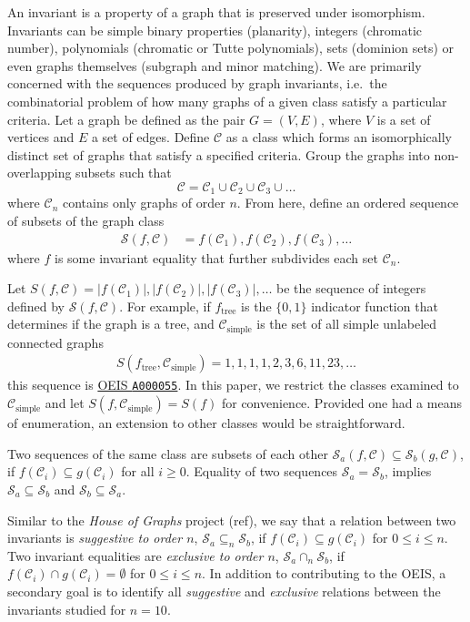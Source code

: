 \documentclass[12pt]{article}
\newcommand{\OEIS}[1]
{\href{https://oeis.org/#1}{OEIS \texttt{#1}}}
\newcommand{\SEQ}{\mathcal{S}}
\newcommand{\CLASS}{\mathcal{C}}
\newcommand{\SIMPLECLASS}{\mathcal{C}_\text{simple}}
\newcommand{\ie}[0]{i.e.\ }
\begin{document}
An invariant is a property of a graph that is preserved under isomorphism. 
Invariants can be simple binary properties (planarity), integers (chromatic number), polynomials (chromatic or Tutte polynomials), sets (dominion sets) or even graphs themselves (subgraph and minor matching).
We are primarily concerned with the sequences produced by graph invariants, \ie the combinatorial problem of how many graphs of a given class satisfy a particular criteria.
Let a graph be defined as the pair $G = (V,E)$, where $V$ is a set of vertices and $E$ a set of edges. 
Define $\CLASS$ as a class which forms an isomorphically distinct set of graphs that satisfy a specified criteria.
Group the graphs into non-overlapping subsets such that
\begin{equation}
\CLASS = \CLASS_1 \cup \CLASS_2 \cup \CLASS_3 \cup \ldots
\end{equation}
where $\CLASS_n$ contains only graphs of order $n$.
From here, define an ordered sequence of subsets of the graph class
%
\begin{align}
\SEQ(f, \CLASS) 
&= f(\CLASS_1), f(\CLASS_2), f(\CLASS_3), \ldots
\end{align}
%
where $f$ is some invariant equality that further subdivides each set $\CLASS_n$.

Let 
$S(f, \CLASS) = |f(\CLASS_1)|, |f(\CLASS_2)|, |f(\CLASS_3)|, \ldots$
be the sequence of integers defined by $\SEQ(f, \CLASS)$. For example, if $f_\text{tree}$ is the $\{0,1\}$ indicator function that determines if the graph is a tree, and $\SIMPLECLASS$ is the set of all simple unlabeled connected graphs
%
\begin{align}
S(f_\text{tree}, \SIMPLECLASS) = 1, 1, 1, 1, 2, 3, 6, 11, 23, \ldots
\end{align}
%
this sequence is \OEIS{A000055}.
In this paper, we restrict the classes examined to $\SIMPLECLASS$ and let $S(f,\SIMPLECLASS)=S(f)$ for convenience. 
Provided one had a means of enumeration, an extension to other classes would be straightforward.

Two sequences of the same class are subsets of each other $\SEQ_a(f,\CLASS) \subseteq \SEQ_b(g, \CLASS)$, if $f(\CLASS_i) \subseteq g(\CLASS_i)$ for all $i\ge0$. Equality of two sequences $\SEQ_a = \SEQ_b$, implies $\SEQ_a \subseteq \SEQ_b$ and $\SEQ_b \subseteq \SEQ_a$. 

Similar to the \textit{House of Graphs} project (ref), we say that a relation between two invariants is \textit{suggestive to order $n$}, $\SEQ_a \subseteq_n \SEQ_b$, if $f(\CLASS_i) \subseteq g(\CLASS_i)$ for $0 \le i \le n$.
Two invariant equalities are \textit{exclusive to order $n$}, $\SEQ_a \cap_n \SEQ_b$, if $f(\CLASS_i) \cap g(\CLASS_i) = \emptyset$ for $0 \le i \le n$.
In addition to contributing to the OEIS, a secondary goal is to identify all \textit{suggestive} and \textit{exclusive} relations between the invariants studied for $n=10$.
\end{document}
